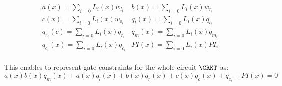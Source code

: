 \[
\begin{array}{cc}
    a(x) = \sum_{i=0} L_i(x)w_{l_i} & b(x) = \sum_{i=0} L_i(x)w_{r_i} \\
    c(x) = \sum_{i=0} L_i(x)w_{o_i} & q_l(x) = \sum_{i=0} L_i(x)q_{l_i}  \\
    q_{r_i}(c) = \sum_{i=0} L_i(x)q_{r_i} & q_m(x) = \sum_{i=0} L_i(x)q_{m_i}  \\
    q_{c_i}(x) = \sum_{i=0} L_i(x)q_{c_i} & PI(x) = \sum_{i=0} L_i(x)PI_i  \\
\end{array}
\]

This enables to represent gate constraints for the whole circuit $\CRKT$ as:
\begin{equation}
    \label{eq:gate-contraints}
    a(x)b(x)q_m(x) + a(x)q_l(x) + b(x)q_r(x) + c(x)q_o(x) + q_{c_i} + PI(x) = 0
\end{equation}




